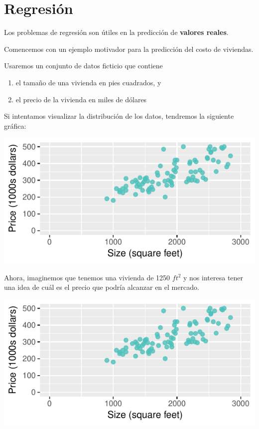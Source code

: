 \documentclass[twoside,twocolumn]{article}
\begin{document}
    \section{Regresión}
        
        Los problemas de regresión son útiles en la predicción de 
        \textbf{valores reales}.

        Comencemos con un ejemplo motivador para la predicción del costo 
        de viviendas.
        
        Usaremos un conjunto de datos ficticio que contiene
        \begin{enumerate}[label=(\alph*)]
          \item el tamaño de una vivienda en pies cuadrados, y
          \item el precio de la vivienda en miles de dólares
        \end{enumerate}

        Si intentamos visualizar la distribución de los datos, tendremos la
        siguiente gráfica:

        \includegraphics[width=\columnwidth, page = 1]{housePrices.pdf}

        Ahora, imaginemos que tenemos una vivienda de 1250 $ft^2$ y
        nos interesa tener una idea de cuál es el precio que podría
        alcanzar en el mercado.

        \includegraphics[width=\columnwidth, page = 2]{housePrices.pdf}
\end{document}

